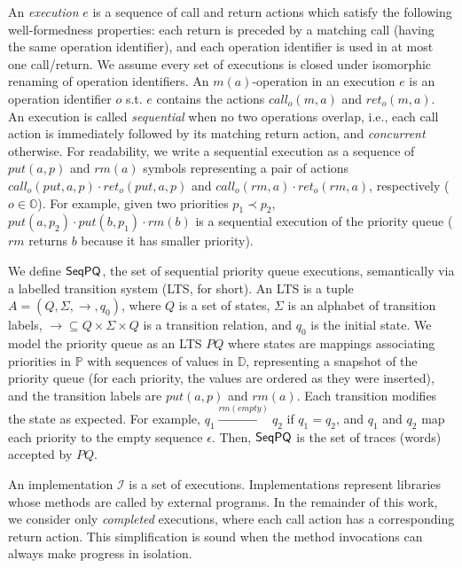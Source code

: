 \documentclass[a4paper,UKenglish]{lipics-v2016}
\begin{document}
An \emph{execution} $e$ is a sequence of call and return actions which satisfy the following well-formedness properties: each return is preceded by a matching call (having the same operation identifier), and each operation identifier is used in at most one call/return. We assume every set of executions is closed under isomorphic renaming of operation identifiers. An $m(a)$-operation in an execution $e$ is an operation identifier $o$ s.t. $e$ contains the actions $\textit{call}_o(m,a)$ and $\textit{ret}_o(m,a)$.
An execution is called \emph{sequential} when no two operations overlap, i.e., each call action is immediately followed by its matching return action, and \emph{concurrent} otherwise. For readability, we write a sequential execution as a sequence of $\textit{put}(a,p)$ and $\textit{rm}(a)$ symbols representing a pair of actions $\textit{call}_o(\textit{put},a,p)\cdot \textit{ret}_o(\textit{put},a,p)$ and $\textit{call}_o(\textit{rm},a)\cdot \textit{ret}_o(\textit{rm},a)$, respectively ($o\in\mathbb{O}$). For example, given two priorities $p_1 \prec p_2$, $\textit{put}(a,p_2) \cdot \textit{put}(b,p_1) \cdot \textit{rm}(b)$ is a sequential execution of the priority queue ($\textit{rm}$ returns $b$ because it has smaller priority).

We define $\mathsf{SeqPQ}$, the set of sequential priority queue executions, semantically via a labelled transition system (LTS, for short). An LTS is a tuple $A=(Q,\Sigma,\rightarrow,q_0)$, where $Q$ is a set of states, $\Sigma$ is an alphabet of transition labels, $\rightarrow\subseteq Q\times\Sigma\times Q$ is a transition relation, and $q_0$ is the initial state. We model the priority queue as an LTS $\textit{PQ}$ where states are mappings associating priorities in $\mathbb{P}$ with sequences of values in $\mathbb{D}$, representing a snapshot of the priority queue (for each priority, the values are ordered as they were inserted), and the transition labels are $\textit{put}(a,p)$ and $\textit{rm}(a)$. Each transition modifies the state as expected. For example, $q_1 \xrightarrow{\textit{rm}(\textit{empty})} q_2$ if $q_1 = q_2$, and $q_1$ and $q_2$ map each priority to the empty sequence $\epsilon$. Then, $\mathsf{SeqPQ}$ is the set of traces (words) accepted by $\textit{PQ}$. 


An implementation $\mathcal{I}$ is a set of executions. Implementations represent libraries whose methods are called by external programs. In the remainder of this work, we consider only \emph{completed} executions, where each call action has a corresponding return action. This simplification is sound when the method invocations can always make progress in isolation. 
\end{document}
